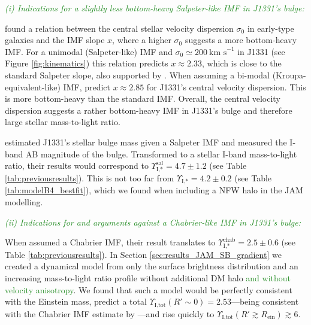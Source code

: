 \documentclass[useAMS,usenatbib]{mnras}
\newcommand{\NEW}[1]{\textcolor{ForestGreen}{#1}}
\begin{document}
\NEW{\emph{(i) Indications for a slightly less bottom-heavy Salpeter-like IMF in J1331's bulge:}} 

\citet{Ferreras} found a relation between the central stellar velocity dispersion $\sigma_0$ in early-type galaxies and the IMF slope $x$, where a higher $\sigma_0$ suggests a more bottom-heavy IMF. For a unimodal (Salpeter-like) IMF and $\sigma_0 \simeq 200~\text{km s}^{-1}$ in J1331 (see Figure \ref{fig:kinematics}) this relation predicts $x \approx 2.33$, which is close to the standard Salpeter slope, also supported by \citet{2014MNRAS.438.1483S}. When assuming a bi-modal (Kroupa-equivalent-like) IMF, \citet{Ferreras} predict $x \approx 2.85$ for J1331's central velocity dispersion. This is more bottom-heavy than the standard \citet{2002Sci...295...82K} IMF. Overall, the central velocity dispersion suggests a rather bottom-heavy IMF in J1331's bulge and therefore large stellar mass-to-light ratio. 

\citet{SWELLSI} estimated J1331's stellar bulge mass given a Salpeter IMF and measured the I-band AB magnitude of the bulge. Transformed to a stellar I-band mass-to-light ratio, their results would correspond to $\Upsilon_\text{I,*}^\text{sal} = 4.7 \pm 1.2$ (see Table \ref{tab:previousresults}). This is not too far from $\Upsilon_\text{I,*} = 4.2 \pm 0.2$ (see Table \ref{tab:modelB4_bestfit}), which we found when including a NFW halo in the JAM modelling.

\NEW{\emph{(ii) Indications for and arguments against a Chabrier-like IMF in J1331's bulge:}} 

When \citet{SWELLSI} assumed a Chabrier IMF, their result translates to $\Upsilon_\text{I,*}^\text{chab} = 2.5 \pm 0.6$ (see Table \ref{tab:previousresults}). In Section \ref{sec:results_JAM_SB_gradient} we created a dynamical model from only the surface brightness distribution and an increasing mass-to-light ratio profile without additional DM halo \NEW{and without velocity anisotropy}. We found that such a model would be perfectly consistent with the Einstein mass, predict a total $\Upsilon_\text{I,tot}(R'\sim0) = 2.53$---being consistent with the Chabrier IMF estimate by \citet{SWELLSI}---and rise quickly to $\Upsilon_\text{I,tot}(R'\gtrsim R_\text{ein}) \gtrsim 6$. 
\end{document}
